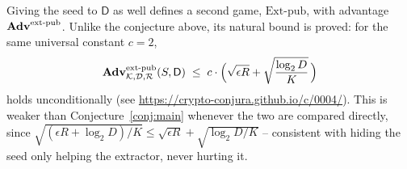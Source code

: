 \documentclass{conjura-conjecture}
\newcommand{\Adv}{\mathbf{Adv}}
\newcommand{\Ext}{\mathrm{Ext}}
\newcommand{\extpub}{\textup{ext-pub}}
\newcommand{\calK}{\mathcal{K}}
\newcommand{\calD}{\mathcal{D}}
\newcommand{\calR}{\mathcal{R}}
\begin{document}
\begin{remark}\label{rem:pub}
Giving the seed to $\mathsf{D}$ as well defines a second game, $\Ext\text{-}\mathrm{pub}$, with
advantage $\Adv^{\extpub}$.  Unlike the conjecture above, its natural bound is proved: for the
same universal constant $c = 2$,
\[
  \Adv^{\extpub}_{\calK,\calD,\calR}(S,\mathsf{D})
  \;\le\; c \cdot \Bigl( \sqrt{\epsilon R} + \sqrt{\frac{\log_2 D}{K}} \,\Bigr)
\]
holds unconditionally (see \url{https://crypto-conjura.github.io/c/0004/}).  This is weaker than
Conjecture~\ref{conj:main} whenever the two are compared directly, since
$\sqrt{(\epsilon R + \log_2 D)/K} \le \sqrt{\epsilon R} + \sqrt{\log_2 D/K}$ -- consistent with
hiding the seed only helping the extractor, never hurting it.
\end{remark}
\end{document}
